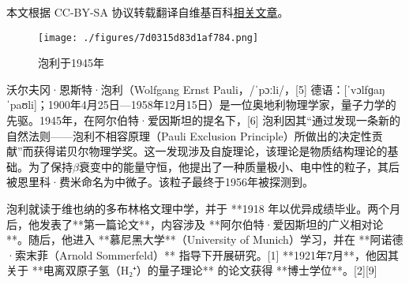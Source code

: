 
本文根据 CC-BY-SA 协议转载翻译自维基百科\href{https://en.wikipedia.org/wiki/Wolfgang_Pauli}{相关文章}。

\begin{figure}[ht]
\centering
\texttt{[image: ./figures/7d0315d83d1af784.png]}
\caption{泡利于1945年} \label{fig_Pauli2_1}
\end{figure}
沃尔夫冈·恩斯特·泡利（Wolfgang Ernst Pauli，/ˈpɔːli/，[5] 德语：[ˈvɔlfɡaŋ ˈpaʊli]；1900年4月25日—1958年12月15日）是一位奥地利物理学家，量子力学的先驱。1945年，在阿尔伯特·爱因斯坦的提名下，[6] 泡利因其“通过发现一条新的自然法则——泡利不相容原理（Pauli Exclusion Principle）所做出的决定性贡献”而获得诺贝尔物理学奖。这一发现涉及自旋理论，该理论是物质结构理论的基础。为了保持\(\beta\)衰变中的能量守恒，他提出了一种质量极小、电中性的粒子，其后被恩里科·费米命名为中微子。该粒子最终于1956年被探测到。

泡利就读于维也纳的多布林格文理中学，并于 **1918 年以优异成绩毕业。两个月后，他发表了**第一篇论文**，内容涉及 **阿尔伯特·爱因斯坦的广义相对论**。随后，他进入 **慕尼黑大学**（University of Munich）学习，并在 **阿诺德·索末菲（Arnold Sommerfeld）** 指导下开展研究。[1] **1921年7月**，他因其关于 **电离双原子氢（H₂⁺）的量子理论** 的论文获得 **博士学位**。[2][9]